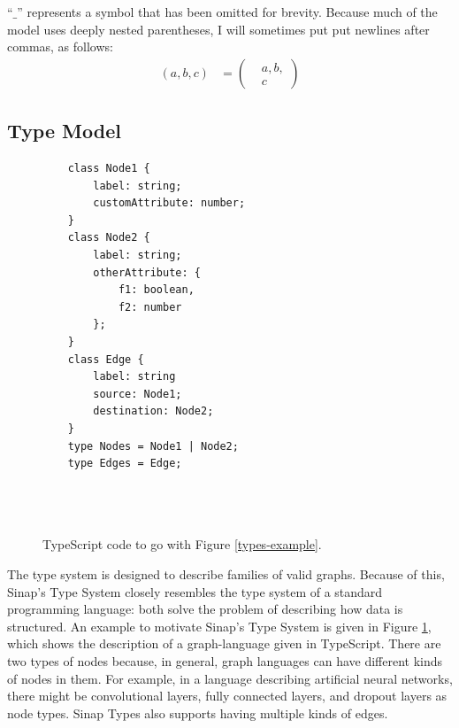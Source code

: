 \documentclass[12pt]{article}
\begin{document}
``\(\_\)'' represents a symbol that has been omitted for brevity. 
Because much of the model uses deeply nested parentheses, 
I will sometimes put put newlines after commas, as follows:
\begin{align*}
    (a,b,c) &= \left(\begin{aligned}
        &a,b,\\&c
    \end{aligned}\right)
\end{align*}

\subsection{Type Model}
\begin{figure}
    \begin{mdframed}    
    \begin{multicols}{2}
    
    \begin{verbatim}
    class Node1 {
        label: string;
        customAttribute: number;
    }
    class Node2 {
        label: string;
        otherAttribute: {
            f1: boolean,
            f2: number
        };
    }
    class Edge {
        label: string
        source: Node1;
        destination: Node2;
    }
    type Nodes = Node1 | Node2;
    type Edges = Edge;

    
    
    \end{verbatim}
    \end{multicols}
    \end{mdframed}
    \caption{TypeScript code to go with Figure \ref{types-example}.}
    \label{types-example-code}
\end{figure}    

The type system is designed to describe families of valid graphs. 
Because of this, Sinap's Type System closely resembles the type system
of a standard programming 
language: both solve the problem of describing how data is structured.
An example to motivate Sinap's Type System is given in Figure 
\ref{types-example-code}, which shows the description of a graph-language
given in TypeScript. There are two types of nodes because, 
in general, graph languages can have different kinds of nodes in them. 
For example, in a language describing artificial neural networks, 
there might be convolutional layers, fully connected layers, and 
dropout layers as node types. Sinap Types also supports having multiple
kinds of edges. 
\end{document}
